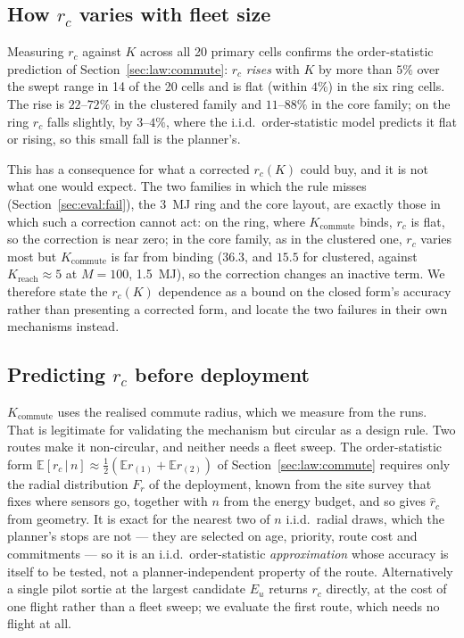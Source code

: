 \documentclass[journal,outdir=./]{IEEEtran}
\newcommand{\Kr}{K_{\mathrm{reach}}}
\newcommand{\Kc}{K_{\mathrm{commute}}}
\newcommand{\rc}{r_{c}}
\newcommand{\Eu}{E_{u}}
\begin{document}
\subsection{How $\rc$ varies with fleet size}\label{sec:eval:rc}
Measuring $\rc$ against $K$ across all 20 primary cells confirms the order-statistic prediction of Section~\ref{sec:law:commute}: $\rc$ \emph{rises} with $K$ by more than $5\%$ over the swept range in 14 of the 20 cells and is flat (within $4\%$) in the six ring cells. The rise is $22$--$72\%$ in the clustered family and $11$--$88\%$ in the core family; on the ring $\rc$ falls slightly, by $3$--$4\%$, where the i.i.d.\ order-statistic model predicts it flat or rising, so this small fall is the planner's.

This has a consequence for what a corrected $\rc(K)$ could buy, and it is not what one would expect. The two families in which the rule misses (Section~\ref{sec:eval:fail}), the 3~MJ ring and the core layout, are exactly those in which such a correction cannot act: on the ring, where $\Kc$ binds, $\rc$ is flat, so the correction is near zero; in the core family, as in the clustered one, $\rc$ varies most but $\Kc$ is far from binding ($36.3$, and $15.5$ for clustered, against $\Kr\approx5$ at $M=100$, 1.5~MJ), so the correction changes an inactive term. We therefore state the $\rc(K)$ dependence as a bound on the closed form's accuracy rather than presenting a corrected form, and locate the two failures in their own mechanisms instead.

\subsection{Predicting $\rc$ before deployment}\label{sec:eval:exante}
$\Kc$ uses the realised commute radius, which we measure from the runs. That is legitimate for validating the mechanism but circular as a design rule. Two routes make it non-circular, and neither needs a fleet sweep. The order-statistic form $\mathbb{E}[\rc\,|\,n]\approx\tfrac12(\mathbb{E}r_{(1)}+\mathbb{E}r_{(2)})$ of Section~\ref{sec:law:commute} requires only the radial distribution $F_r$ of the deployment, known from the site survey that fixes where sensors go, together with $n$ from the energy budget, and so gives $\hat\rc$ from geometry. It is exact for the nearest two of $n$ i.i.d.\ radial draws, which the planner's stops are not --- they are selected on age, priority, route cost and commitments --- so it is an i.i.d.\ order-statistic \emph{approximation} whose accuracy is itself to be tested, not a planner-independent property of the route. Alternatively a single pilot sortie at the largest candidate $\Eu$ returns $\rc$ directly, at the cost of one flight rather than a fleet sweep; we evaluate the first route, which needs no flight at all.
\end{document}
